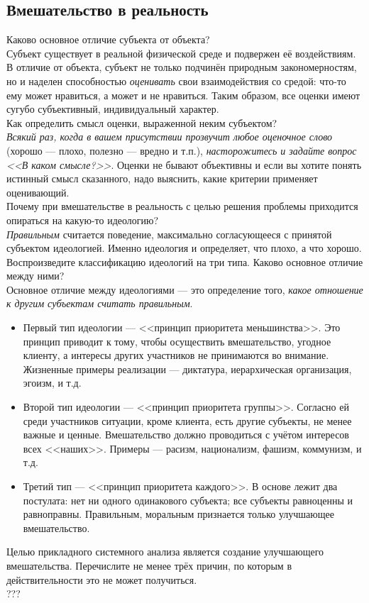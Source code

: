 \documentclass{article}
\newcommand{\note}[1]{\textit{#1}}
\begin{document}
\subsection*{Вмешательство в реальность}
Каково основное отличие субъекта от объекта?
\\
Субъект существует в реальной физической среде и подвержен её воздействиям. В отличие от объекта, субъект не только подчинён природным закономерностям, но и наделен способностью \note{оценивать} свои взаимодействия со средой: что-то ему может нравиться, а может и не нравиться. Таким образом, все оценки имеют сугубо субъективный, индивидуальный характер.
\\
Как определить смысл оценки, выраженной неким субъектом?
\\
\note{Всякий раз, когда в вашем присутствии прозвучит любое оценочное слово} (хорошо --- плохо, полезно --- вредно и т.п.), \note{насторожитесь и задайте вопрос <<В каком смысле?>>}. Оценки не бывают объективны и если вы хотите понять истинный смысл сказанного, надо выяснить, какие критерии применяет оценивающий.
\\
Почему при вмешательстве в реальность с целью решения проблемы приходится опираться на какую-то идеологию?
\\
\note{Правильным} считается поведение, максимально согласующееся с принятой субъектом идеологией. Именно идеология и определяет, что плохо, а что хорошо. 
\\
Воспроизведите классификацию идеологий на три типа. Каково основное отличие между ними?
\\
Основное отличие между идеологиями --- это определение того, \note{какое отношение к другим субъектам считать правильным}.
\begin{itemize}
	\item Первый тип идеологии --- <<принцип приоритета меньшинства>>. Это принцип приводит к тому, чтобы осуществить вмешательство, угодное клиенту, а интересы других участников не принимаются во внимание. Жизненные примеры реализации --- диктатура, иерархическая организация, эгоизм, и т.д.
	\item Второй тип идеологии --- <<принцип приоритета группы>>. Согласно ей среди участников ситуации, кроме клиента, есть другие субъекты, не менее важные и ценные. Вмешательство должно проводиться с учётом интересов всех <<наших>>. Примеры --- расизм, национализм, фашизм, коммунизм, и т.д.
	\item Третий тип --- <<принцип приоритета каждого>>. В основе лежит два постулата: нет ни одного одинакового субъекта; все субъекты равноценны и равноправны. Правильным, моральным признается только улучшающее вмешательство.
\end{itemize}
Целью прикладного системного анализа является создание улучшающего вмешательства. Перечислите не менее трёх причин, по которым в действительности это не может получиться.
\\
???
\\
\end{document}
